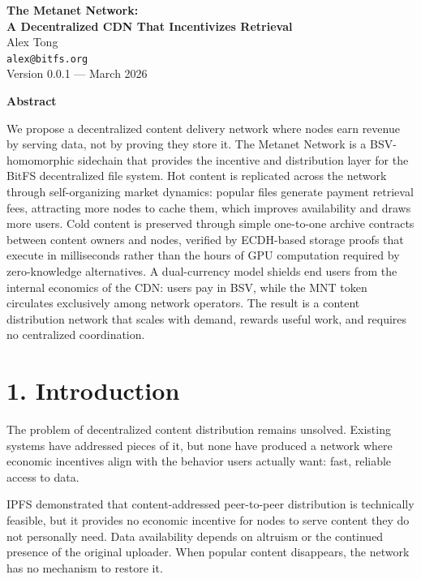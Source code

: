\documentclass[11pt,a4paper]{article}
\renewenvironment{abstract}{%
  \begin{center}
    \bfseries Abstract
  \end{center}
  \itshape
}{\par\bigskip}
\begin{document}
\begin{center}
  {\LARGE\bfseries The Metanet Network:\\[0.3em]
  A Decentralized CDN That Incentivizes Retrieval}\\[1.5em]
  {\large Alex Tong}\\[0.3em]
  \texttt{alex@bitfs.org}\\[0.8em]
  {\small Version 0.0.1 --- March 2026}\\[1.5em]
\end{center}

\begin{abstract}
We propose a decentralized content delivery network where nodes earn revenue by serving data, not by proving they store it. The Metanet Network is a BSV-homomorphic sidechain that provides the incentive and distribution layer for the BitFS decentralized file system. Hot content is replicated across the network through self-organizing market dynamics: popular files generate payment retrieval fees, attracting more nodes to cache them, which improves availability and draws more users. Cold content is preserved through simple one-to-one archive contracts between content owners and nodes, verified by ECDH-based storage proofs that execute in milliseconds rather than the hours of GPU computation required by zero-knowledge alternatives. A dual-currency model shields end users from the internal economics of the CDN: users pay in BSV, while the MNT token circulates exclusively among network operators. The result is a content distribution network that scales with demand, rewards useful work, and requires no centralized coordination.
\end{abstract}

\section{1. Introduction}

The problem of decentralized content distribution remains unsolved. Existing systems have addressed pieces of it, but none have produced a network where economic incentives align with the behavior users actually want: fast, reliable access to data.

IPFS demonstrated that content-addressed peer-to-peer distribution is technically feasible, but it provides no economic incentive for nodes to serve content they do not personally need. Data availability depends on altruism or the continued presence of the original uploader. When popular content disappears, the network has no mechanism to restore it.
\end{document}
